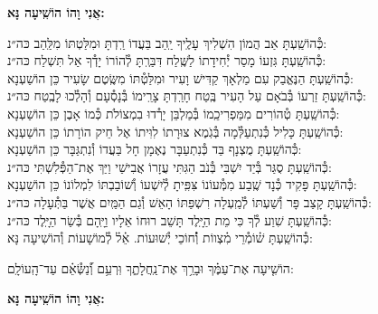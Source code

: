 \documentclass[twoside, openany, parskip=half, 11pt]{book}
\begin{document}
\begin{large}
\textbf{אֲנִי וָהוֹ הוֹשִֽׁיעָה נָּא:}
\end{large}

\begin{small}
כְּ֯הוֹשַֽׁעְתָּ אַב הֲמוֹן הִשְׁלִיךְ עָלֶֽיךָ יַֽהַב בַּעֲדוֹ רַֽדְתָּ וּמִלַּטְתּוֹ מִלַּֽהַב \hfill כּה״נ:\\
כְּ֯הוֹשַֽׁעְתָּ גִּזְעוֹ מָסַר יְ֯חִידָתוֹ לַשֶּֽׁלַח דִּבַּרְֽתָּ לְ֯הוֹרוֹ יָדְ֯ךָ אַל תִּשְׁלַח \hfill כּה״נ: \\
כְּ֯הוֹשַֽׁעְתָּ הַנֶּאֱבַק עִם מַלְאָךְ קַדִּישׁ וָעִיר וּמִלַּטְ֯תּוֹ מִשֶּֽׂטֶם שָׂעִיר \hfill כֵּן הוֹשַׁעְנָא: \\
כְּ֯הוֹשַֽׁעְתָּ זַרְעוֹ בְּ֯בֹאָם עַל הָעִיר בֶּֽטַח חָרַֽדְתָּ צָרֵֽימוֹ בְּ֯נָסְ֯עָם וְ֯הָלְ֯כוּ לָבֶֽטַח \hfill כּה״נ: \\
כְּ֯הוֹשַֽׁעְתָּ טְ֯הוֹרִים מִמַּפְרִיכֵֽמוֹ בְּ֯מַלְבֵּן יָרְ֯דוּ בִמְצוֹלֹת כְּ֯מוֹ אָבֶן \hfill כֵּן הוֹשַׁעְנָא: \\
כְּ֯הוֹשַֽׁעְתָּ כָּלִיל כְּ֯נִתְעַלְּ֯מָה בְּ֯גֹֽמֶא צוּרָתוֹ לִוִּיתוֹ אֶל חֵיק הוֹרָתוֹ \hfill כֵּן הוֹשַׁעְנָא: \\
כְּ֯הוֹשַֽׁעְתָּ מֻצְנָף בַּד כְּ֯נִתְעַבָּר נֶאֶמָן חָל בַּעֲדוֹ וְ֯נִתְגַּבָּר \hfill כֵּן הוֹשַׁעְנָא: \\
כְּ֯הוֹשַֽׁעְתָּ סֻגַּר בְּ֯יַד יִשְׁבִּי בְּ֯נֹב הַגִּתִּי עֲזָרוֹ אֲבִישַׁי וַיַּךְ אֶת־הַפְּ֯לִשְׁתִּי \hfill כּה״נ:\\
כְּ֯הוֹשַֽׁעְתָּ פָּקִיד כְּ֯נָד שֶֽׁבַע מִמְּ֯עוֹנוֹ צִּפִּֽיתָ לְ֯יִשְׁעוֹ וְ֯שׁוֹבַבְתּוֹ לִמְלוֹנוֹ \hfill כֵּן הוֹשַׁעְנָא:\\
כְּ֯הוֹשַֽׁעְתָּ קָצַב פָּר וְ֯שַׁעְתּוֹ לְ֯מַֽעְלָה רִשְׁפַּתּוֹ הָאֵשׁ וְ֯גַם הַמַּֽיִם אֲשֶׁר בַּתְּ֯עָלָה \hfill כּה״נ:\\
כְּ֯הוֹשַֽׁעְתָּ שִׁוַע לְ֯ךָ כִּי מֵת הַיָּֽלֶד תָּשֵׁב רוּחוֹ אֵלָיו וַיָּֽהָם בְּ֯שַׂר הַיָּֽלֶד \hfill כּה״נ:\\
כְּ֯הוֹשַֽׁעְתָּ שׁ֗וֹמְ֯רֵי מִ֗צְווֹת וְ֯֗חוֹכֵי יְ֯שׁוּעוֹת. אֵ֗ל֗ לְ֯מוֹשָׁעוֹת \hfill וְ֯הוֹשִׁיעָה נָּא:\\

\end{small}

הוֹשִׁ֤יעָה אֶת־עַמֶּ֗ךָ וּבָרֵ֥ךְ אֶת־נַֽחֲלָתֶ֑ךָ וּֽרְעֵ֥ם וְ֯֝נַשְּׂ֯אֵ֗ם עַד־הָֽעוֹלָֽם:


\begin{large}
\textbf{אֲנִי וָהוֹ הוֹשִֽׁיעָה נָּא:}
\end{large}
\end{document}
